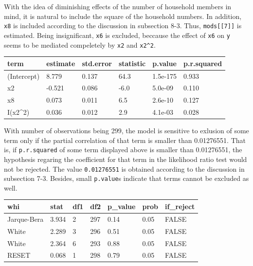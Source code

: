 \documentclass[a4paper]{article}
\begin{document}
With the idea of diminishing effects of the number of household members
in mind, it is natural to include the square of the household numbers.
In addition, \texttt{x8} is included according to the discussion in
subsection 8-3. Thus, \texttt{mods{[}{[}7{]}{]}} is estimated. Being
insignificant, \texttt{x6} is excluded, beccause the effect of
\texttt{x6} on \texttt{y} seems to be mediated compeletely by
\texttt{x2} and \texttt{x2\^{}2}.

\begin{table}[H]
\centering
\begin{tabular}{llllll}
\toprule
term & estimate & std.error & statistic & p.value & p.r.squared\\
\midrule
(Intercept) & 8.779 & 0.137 & 64.3 & 1.5e-175 & 0.933\\
x2 & -0.521 & 0.086 & -6.0 & 5.0e-09 & 0.110\\
x8 & 0.073 & 0.011 & 6.5 & 2.6e-10 & 0.127\\
I(x2\textasciicircum{}2) & 0.036 & 0.012 & 2.9 & 4.1e-03 & 0.028\\
\bottomrule
\end{tabular}
\end{table}

With number of observations being 299, the model is sensitive to
exlusion of some term only if the partial correlation of that term is
smaller than 0.01276551. That is, if \texttt{p.r.squared} of some term
displayed above is smaller than 0.01276551, the hypothesis regaring the
coefficient for that term in the likelihood ratio test would not be
rejected. The value \texttt{0.01276551} is obtained according to the
discussion in subsection 7-3. Besides, small \texttt{p.value}s indicate
that terms cannot be excluded as well.

\begin{table}[H]
\centering
\begin{tabular}{lllllll}
\toprule
whi & stat & df1 & df2 & p\_value & prob & if\_reject\\
\midrule
Jarque-Bera & 3.934 & 2 & 297 & 0.14 & 0.05 & FALSE\\
White & 2.289 & 3 & 296 & 0.51 & 0.05 & FALSE\\
White & 2.364 & 6 & 293 & 0.88 & 0.05 & FALSE\\
RESET & 0.068 & 1 & 298 & 0.79 & 0.05 & FALSE\\
\bottomrule
\end{tabular}
\end{table}
\end{document}

